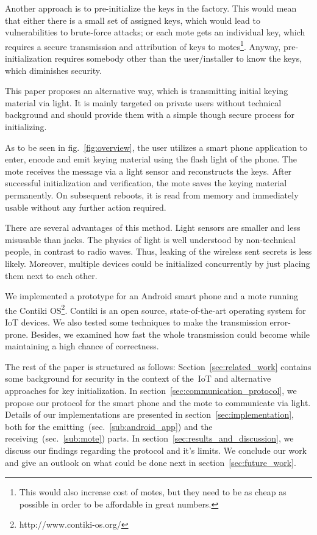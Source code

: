 \documentclass{sig-alternate} %
\begin{document}
Another approach is to pre-initialize the keys in the factory.
This would mean that either there is a small set of assigned keys, which would lead to vulnerabilities to brute-force attacks; or each mote gets an individual key, which requires a secure transmission and attribution of keys to motes\footnote{This would also increase cost of motes, but they need to be as cheap as possible in order to be affordable in great numbers.}.
Anyway, pre-initialization requires somebody other than the user/installer to know the keys, which diminishes security.

This paper proposes an alternative way, which is transmitting initial keying material via light.
It is mainly targeted on private users without technical background and should provide them with a simple though secure process for initializing.

As to be seen in fig.~\ref{fig:overview}, the user utilizes a smart phone application to enter, encode and emit keying material using the flash light of the phone.
The mote receives the message via a light sensor and reconstructs the keys.
After successful initialization and verification, the mote saves the keying material permanently.
On subsequent reboots, it is read from memory and immediately usable without any further action required.

There are several advantages of this method.
Light sensors are smaller and less misusable than jacks.
The physics of light is well understood by non-technical people, in contrast to radio waves.
Thus, leaking of the wireless sent secrets is less likely.
Moreover, multiple devices could be initialized concurrently by just placing them next to each other.

We implemented a prototype for an Android smart phone and a mote running the Contiki OS\footnote{http://www.contiki-os.org/}.
Contiki is an open source, state-of-the-art operating system for IoT devices.
We also tested some techniques to make the transmission error-prone.
Besides, we examined how fast the whole transmission could become while maintaining a high chance of correctness.

The rest of the paper is structured as follows:
Section~\ref{sec:related_work} contains some background for security in the context of the~IoT and alternative approaches for key initialization.
In section~\ref{sec:communication_protocol}, we propose our protocol for the smart phone and the mote to communicate via light.
Details of our implementations are presented in section~\ref{sec:implementation}, both for the emitting~(sec.~\ref{sub:android_app}) and the receiving~(sec.~\ref{sub:mote}) parts.
In section~\ref{sec:results_and_discussion}, we discuss our findings regarding the protocol and it's limits.
We conclude our work and give an outlook on what could be done next in section~\ref{sec:future_work}.
\end{document}
